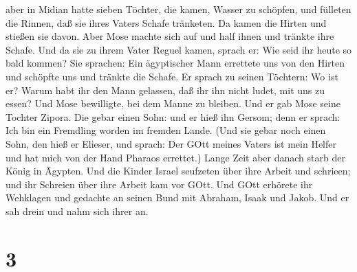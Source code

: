 aber in Midian hatte sieben Töchter, die kamen, Wasser zu schöpfen, und
fülleten die Rinnen, daß sie ihres Vaters Schafe tränketen.
 Da kamen die Hirten und stießen sie davon. Aber Mose
machte sich auf und half ihnen und tränkte ihre Schafe. 
Und da sie zu ihrem Vater Reguel kamen, sprach er: Wie seid ihr heute so
bald kommen?  Sie sprachen: Ein ägyptischer Mann errettete
uns von den Hirten und schöpfte uns und tränkte die Schafe.
 Er sprach zu seinen Töchtern: Wo ist er? Warum habt ihr
den Mann gelassen, daß ihr ihn nicht ludet, mit uns zu essen?
 Und Mose bewilligte, bei dem Manne zu bleiben. Und er gab
Mose seine Tochter Zipora.  Die gebar einen Sohn: und er
hieß ihn Gersom; denn er sprach: Ich bin ein Fremdling worden im fremden
Lande. (Und sie gebar noch einen Sohn, den hieß er Elieser, und sprach:
Der GOtt meines Vaters ist mein Helfer und hat mich von der Hand Pharaos
errettet.)  Lange Zeit aber danach starb der König in
Ägypten. Und die Kinder Israel seufzeten über ihre Arbeit und schrieen;
und ihr Schreien über ihre Arbeit kam vor GOtt.  Und GOtt
erhörete ihr Wehklagen und gedachte an seinen Bund mit Abraham, Isaak
und Jakob.  Und er sah drein und nahm sich ihrer an.

\hypertarget{section-2}{%
\section{3}\label{section-2}}

